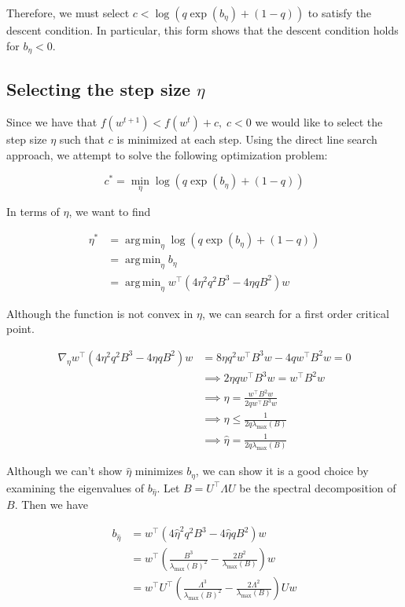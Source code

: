 \documentclass[11pt]{article}
\DeclareMathOperator*{\argmin}{arg\,min}
\begin{document}
Therefore, we must select $c < \log( q \exp(b_\eta ) + (1 - q))$ to satisfy the descent condition. In particular, this form shows that the descent condition holds for $b_\eta < 0$.

\subsection{Selecting the step size $\eta$}

Since we have that $f(w^{t+1}) < f(w^t) + c, \; c < 0$ we would like to select the step size $\eta$ such that $c$ is minimized at each step. Using the direct line search approach, we attempt to solve the following optimization problem:

\begin{equation}
    c^* = \min_{\eta} \log( q \exp(b_\eta ) + (1 - q))
\end{equation}

In terms of $\eta$, we want to find

\begin{equation}
\label{eq:eta_opt}
\begin{split}
    \eta^* &= \argmin_{\eta} \log( q \exp(b_\eta ) + (1 - q)) \\
    &= \argmin_{\eta} b_\eta \\
    &= \argmin_{\eta} w^{\top} ( 4 \eta^2 q^2 B^3 - 4 \eta q B^2)w
\end{split}
\end{equation}

Although the function is not convex in $\eta$, we can search for a first order critical point.

\begin{align*}
\nabla_{\eta} w^{\top} ( 4 \eta^2 q^2 B^3 - 4 \eta q B^2)w 
&= 8 \eta q^2 w^{\top} B^3 w - 4 q w^{\top} B^2 w = 0 \\
&\implies 2 \eta q w^{\top} B^3 w = w^{\top} B^2 w \\
&\implies \eta = \frac{w^{\top} B^2 w}{2 q w^{\top} B^3 w} \\ 
&\implies \eta \leq \frac{1}{2q\lambda_{\max}(B)} \\
&\implies \hat{\eta} = \frac{1}{2q\lambda_{\max}(B)}
\end{align*}

Although we can't show $\hat{\eta}$ minimizes $b_{\eta}$, we can show it is a good choice by examining the eigenvalues of $b_{\hat{\eta}}$. Let $B = U^{\top} \Lambda U$ be the spectral decomposition of $B$. Then we have

\begin{align*}
    b_{\hat{\eta}} &= w^{\top} ( 4 \hat{\eta}^2 q^2 B^3 - 4 \hat{\eta} q B^2)w \\
    &= w^{\top} \left( \frac{B^3}{\lambda_{\max}(B)^2} - \frac{2 B^2}{\lambda_{\max}(B)} \right) w \\
    &= w^{\top} U^{\top} \left( \frac{\Lambda^3}{\lambda_{\max}(B)^2} - \frac{2 \Lambda^2}{\lambda_{\max}(B)} \right) Uw
\end{align*}
\end{document}
